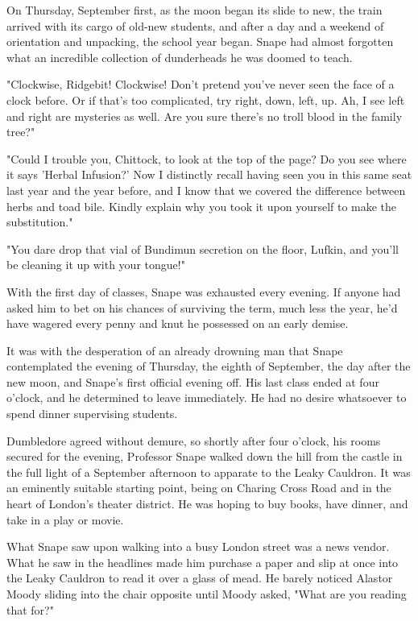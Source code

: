 \documentclass[a4paper,11pt]{article}
\begin{document}
On Thursday, September first, as the moon began its slide to new, the train arrived with its cargo of old-new students, and after a day and a weekend of orientation and unpacking, the school year began. Snape had almost forgotten what an incredible collection of dunderheads he was doomed to teach.

"Clockwise, Ridgebit! Clockwise! Don't pretend you've never seen the face of a clock before. Or if that's too complicated, try right, down, left, up. Ah, I see left and right are mysteries as well. Are you sure there's no troll blood in the family tree?"

"Could I trouble you, Chittock, to look at the top of the page? Do you see where it says 'Herbal Infusion?' Now I distinctly recall having seen you in this same seat last year and the year before, and I know that we covered the difference between herbs and toad bile. Kindly explain why you took it upon yourself to make the substitution."

"You dare drop that vial of Bundimun secretion on the floor, Lufkin, and you'll be cleaning it up with your tongue!"

With the first day of classes, Snape was exhausted every evening. If anyone had asked him to bet on his chances of surviving the term, much less the year, he'd have wagered every penny and knut he possessed on an early demise.

It was with the desperation of an already drowning man that Snape contemplated the evening of Thursday, the eighth of September, the day after the new moon, and Snape's first official evening off. His last class ended at four o'clock, and he determined to leave immediately. He had no desire whatsoever to spend dinner supervising students.

Dumbledore agreed without demure, so shortly after four o'clock, his rooms secured for the evening, Professor Snape walked down the hill from the castle in the full light of a September afternoon to apparate to the Leaky Cauldron. It was an eminently suitable starting point, being on Charing Cross Road and in the heart of London's theater district. He was hoping to buy books, have dinner, and take in a play or movie.

What Snape saw upon walking into a busy London street was a news vendor. What he saw in the headlines made him purchase a paper and slip at once into the Leaky Cauldron to read it over a glass of mead. He barely noticed Alastor Moody sliding into the chair opposite until Moody asked, "What are you reading that for?"
\end{document}
